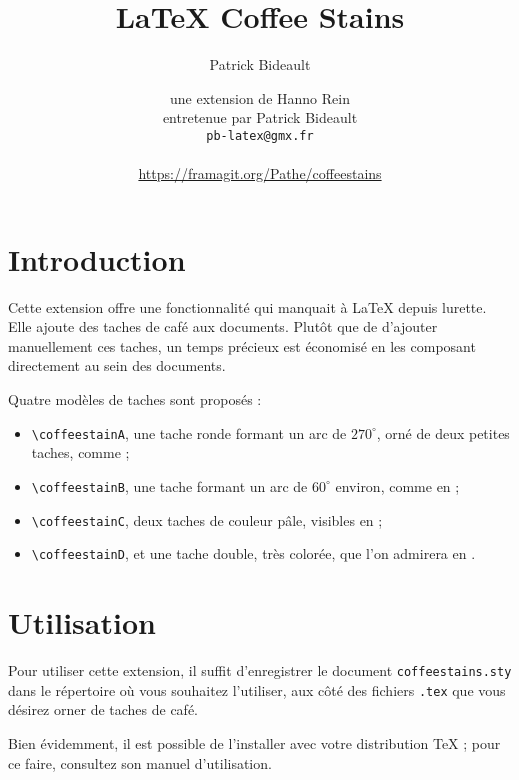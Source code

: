 \documentclass[a4paper, 11pt, BCOR = 0 pt, DIV = 13, oneside, french]{scrartcl}
\author{Patrick Bideault}
\begin{document}
\title{LaTeX Coffee Stains}
\author{une extension de Hanno Rein\\
  entretenue par Patrick Bideault\\
  \texttt{pb-latex@gmx.fr}\\
  ~\\
  \url{https://framagit.org/Pathe/coffeestains}}
\renewcommand{\today}{version \gitRel{} -- \DTMtoday{}}
\maketitle

\label{stainA}
\section{Introduction}
Cette extension offre une fonctionnalité qui manquait à \LaTeX{} depuis
lurette. Elle ajoute des taches de café aux documents. Plutôt que de
d'ajouter manuellement ces taches, un temps précieux est
économisé en les composant directement au sein des documents.

Quatre modèles de taches sont proposés :

\begin{itemize}
\item \verb|\coffeestainA|, une tache ronde formant un arc de $270^\circ$, orné de deux petites
  taches, comme  ;
\item \verb|\coffeestainB|, une tache formant un arc de $60^\circ$ environ, comme en
     ;
\item \verb|\coffeestainC|, deux taches de couleur pâle, visibles en  ;
\item \verb|\coffeestainD|, et une tache double, très colorée, que l'on admirera en .
\end{itemize}

\section{Utilisation}
Pour utiliser cette extension, il suffit d'enregistrer le document
\texttt{coffeestains.sty} dans le répertoire où vous souhaitez l'utiliser, aux
côté des fichiers \texttt{.tex} que vous désirez orner de taches de café.

Bien évidemment, il est possible de l'installer avec votre distribution \TeX{} ;
pour ce faire, consultez son manuel d'utilisation.
\end{document}
